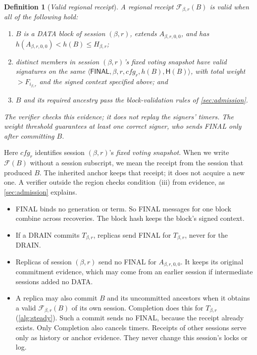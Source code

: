 \documentclass[11pt,a4paper]{article}
\newcommand{\FC}{\mathcal F}
\newcommand{\Hash}{\mathsf H}
\newcommand{\tagg}[1]{\ensuremath{\mathsf{#1}}}
\newcommand{\defterm}[1]{\textcolor{rrBlue}{\textit{#1}}}
\newtheorem{definition}{Definition}[section]
\begin{document}
\begin{definition}[\defterm{Valid regional receipt}]
\label{def:receipt}
A regional receipt $\FC_{\beta,r}(B)$ is valid when all of the following hold:
\begin{enumerate}[label=(\roman*)]
\item $B$ is a DATA block of session $(\beta,r)$, extends $A_{\beta,r,0,0}$, and has
$h(A_{\beta,r,0,0})<h(B)\le H_{\beta,r}$;
\item distinct members in session $(\beta,r)$'s fixed voting snapshot have
valid signatures on the same
$\langle\tagg{FINAL},\beta,r,\mathit{cfg}_r,h(B),\Hash(B)\rangle$,
with total weight $>F_{i_{\beta,r}}$ and the signed context specified above; and
\item $B$ and its required ancestry pass the block-validation rules of
\cref{sec:admission}.
\end{enumerate}
The verifier checks this evidence; it does not replay the signers'
timers. The weight threshold guarantees at least one correct signer,
who sends FINAL only after committing $B$.
\end{definition}
Here $\mathit{cfg}_r$ identifies session $(\beta,r)$'s \defterm{fixed voting snapshot}.
When we write $\FC(B)$ without a session subscript, we mean the receipt
from the session that produced $B$. The inherited anchor keeps that
receipt; it does not acquire a new one. A verifier outside
the region checks condition~(iii) from evidence, as
\cref{sec:admission} explains.
\begin{itemize}
\item FINAL binds no generation or term. So FINAL messages for one block
combine across recoveries. The block hash keeps the block's signed
context.
\item If a DRAIN commits $T_{\beta,r}$, replicas send FINAL for $T_{\beta,r}$, never for
the DRAIN.
\item Replicas of session $(\beta,r)$ send no FINAL for $A_{\beta,r,0,0}$. It keeps its original commitment evidence, which may come from an
earlier session if intermediate sessions added no DATA.
\item A replica may also commit $B$ and its uncommitted
ancestors when it obtains a valid $\FC_{\beta,r}(B)$ of its own session.
Completion does this for $T_{\beta,r}$ (\cref{alg:steady}). Such a commit
sends no FINAL, because the receipt already exists. Only Completion
also cancels timers. Receipts of other sessions serve only as history or anchor
evidence. They never change this session's locks or log.
\end{itemize}
\end{document}

